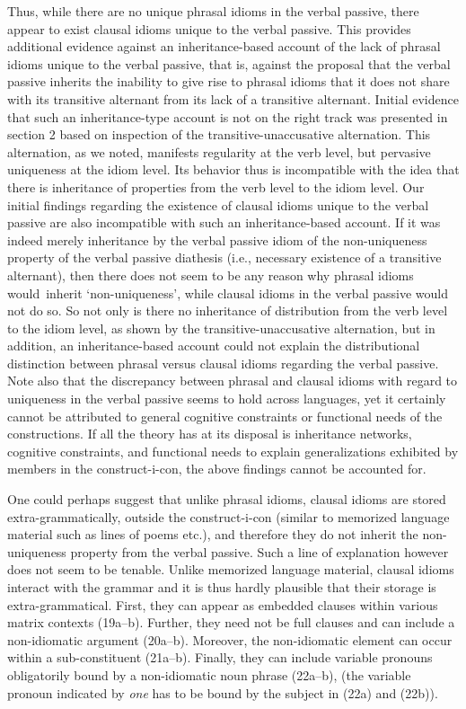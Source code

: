 \documentclass[output=paper,
modfonts
]{LSP/langsci}
\begin{document}
Thus, while there are no unique phrasal idioms in the verbal passive,
there appear to exist clausal idioms unique to the verbal passive. This
provides additional evidence against an inheritance-based account of the
lack of phrasal idioms unique to the verbal passive, that is, against
the proposal that the verbal passive inherits the inability to give rise
to phrasal idioms that it does not share with its transitive alternant
from its lack of a transitive alternant. Initial evidence that such an
inheritance-type account is not on the right track was presented in
section 2 based on inspection of the transitive-unaccusative
alternation. This alternation, as we noted, manifests regularity at the
verb level, but pervasive uniqueness at the idiom level. Its behavior
thus is incompatible with the idea that there is inheritance of
properties from the verb level to the idiom level. Our initial findings
regarding the existence of clausal idioms unique to the verbal passive
are also incompatible with such an inheritance-based account. If it was
indeed merely inheritance by the verbal passive idiom of the
non-uniqueness property of the verbal passive diathesis (i.e., necessary
existence of a transitive alternant), then there does not seem to be any
reason why phrasal idioms would~inherit `non-uniqueness', while clausal
idioms in the verbal passive would not do so. So not only is there no
inheritance of distribution from the verb level to the idiom level, as
shown by the transitive-unaccusative alternation, but in addition, an
inheritance-based account could not explain the distributional
distinction between phrasal versus clausal idioms regarding the verbal
passive. Note also that the discrepancy between phrasal and clausal
idioms with regard to uniqueness in the verbal passive seems to hold
across languages, yet it certainly cannot be attributed to general
cognitive constraints or functional needs of the constructions. If all
the theory has at its disposal is inheritance networks, cognitive
constraints, and functional needs to explain generalizations exhibited
by members in the construct-i-con, the above findings cannot be
accounted for.

One could perhaps suggest that unlike phrasal idioms, clausal idioms are
stored extra-grammatically, outside the construct-i-con (similar to
memorized language material such as lines of poems etc.), and therefore
they do not inherit the non-uniqueness property from the verbal passive.
Such a line of explanation however does not seem to be tenable. Unlike
memorized language material, clausal idioms interact with the grammar
and it is thus hardly plausible that their storage is extra-grammatical.
First, they can appear as embedded clauses within various matrix
contexts (19a--b). Further, they need not be full clauses and can include
a non-idiomatic argument (20a--b). Moreover, the non-idiomatic element
can occur within a sub-constituent (21a--b). Finally, they can include
variable pronouns obligatorily bound by a non-idiomatic noun phrase
(22a--b), (the variable pronoun indicated by \emph{one} has to be bound
by the subject in (22a) and (22b)).
\end{document}
